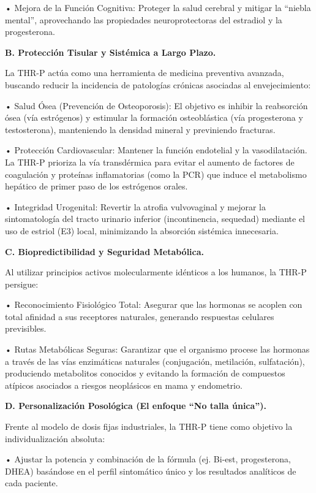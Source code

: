 \documentclass[
  spanish,
]{article}
\begin{document}
• Mejora de la Función Cognitiva: Proteger la salud cerebral y mitigar la ``niebla mental'', aprovechando las propiedades neuroprotectoras del estradiol y la progesterona.

\textbf{B. Protección Tisular y Sistémica a Largo Plazo.}

La THR-P actúa como una herramienta de medicina preventiva avanzada, buscando reducir la incidencia de patologías crónicas asociadas al envejecimiento:

• Salud Ósea (Prevención de Osteoporosis): El objetivo es inhibir la reabsorción ósea (vía estrógenos) y estimular la formación osteoblástica (vía progesterona y testosterona), manteniendo la densidad mineral y previniendo fracturas.

• Protección Cardiovascular: Mantener la función endotelial y la vasodilatación. La THR-P prioriza la vía transdérmica para evitar el aumento de factores de coagulación y proteínas inflamatorias (como la PCR) que induce el metabolismo hepático de primer paso de los estrógenos orales.

• Integridad Urogenital: Revertir la atrofia vulvovaginal y mejorar la sintomatología del tracto urinario inferior (incontinencia, sequedad) mediante el uso de estriol (E3) local, minimizando la absorción sistémica innecesaria.

\textbf{C. Biopredictibilidad y Seguridad Metabólica.}

Al utilizar principios activos molecularmente idénticos a los humanos, la THR-P persigue:

• Reconocimiento Fisiológico Total: Asegurar que las hormonas se acoplen con total afinidad a sus receptores naturales, generando respuestas celulares previsibles.

• Rutas Metabólicas Seguras: Garantizar que el organismo procese las hormonas a través de las vías enzimáticas naturales (conjugación, metilación, sulfatación), produciendo metabolitos conocidos y evitando la formación de compuestos atípicos asociados a riesgos neoplásicos en mama y endometrio.

\textbf{D. Personalización Posológica (El enfoque ``No talla única'').}

Frente al modelo de dosis fijas industriales, la THR-P tiene como objetivo la individualización absoluta:

• Ajustar la potencia y combinación de la fórmula (ej. Bi-est, progesterona, DHEA) basándose en el perfil sintomático único y los resultados analíticos de cada paciente.
\end{document}
